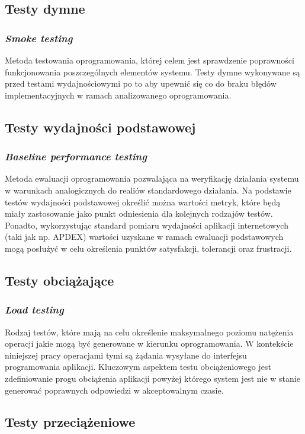 \subsection*{Testy dymne}
\subsubsection{\textit{Smoke testing}}
Metoda testowania oprogramowania, której celem jest sprawdzenie poprawności funkcjonowania poszczególnych elementów systemu. Testy dymne wykonywane są przed testami wydajnościowymi po to aby upewnić się co do braku błędów implementacyjnych w ramach analizowanego oprogramowania.

\subsection*{Testy wydajności podstawowej}
\subsubsection{\textit{Baseline performance testing}}
Metoda ewaluacji oprogramowania pozwalająca na weryfikację działania systemu w warunkach analogicznych do realiów standardowego działania. Na podstawie testów wydajności podstawowej określić można wartości metryk, które będą miały zastosowanie jako punkt odniesienia dla kolejnych rodzajów testów. Ponadto, wykorzystując standard pomiaru wydajności aplikacji internetowych (taki jak np. APDEX) wartości uzyskane w ramach ewaluacji podstawowych mogą posłużyć w celu określenia punktów satysfakcji, tolerancji oraz frustracji.

\subsection*{Testy obciążające}
\subsubsection{\textit{Load testing}}
Rodzaj testów, które mają na celu określenie maksymalnego poziomu natężenia operacji jakie mogą być generowane w kierunku oprogramowania. W kontekście niniejszej pracy operacjami tymi są żądania wysyłane do interfejsu programowania aplikacji. Kluczowym aspektem testu obciążeniowego jest zdefiniowanie progu obciążenia aplikacji powyżej którego system jest nie w stanie generować poprawnych odpowiedzi w akceptowalnym czasie.

\subsection*{Testy przeciążeniowe}
